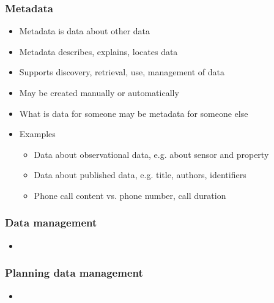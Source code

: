 \documentclass{beamer}
\begin{document}
\begin{frame}
  \frametitle{Metadata}
  
  \begin{itemize}
  \item Metadata is data about other data
  \item Metadata describes, explains, locates data
  \item Supports discovery, retrieval, use, management of data
  \item May be created manually or automatically
  \item What is data for someone may be metadata for someone else
  \item Examples
  \begin{itemize}
    \item Data about observational data, e.g. about sensor and property
    \item Data about published data, e.g. title, authors, identifiers
    \item Phone call content vs. phone number, call duration
  \end{itemize}
  \end{itemize}
\end{frame}

\begin{frame}
  \frametitle{Data management}
  
  \begin{itemize}
  \item 
  \end{itemize}
\end{frame}

\begin{frame}
  \frametitle{Planning data management}
  
  \begin{itemize}
  \item 
  \end{itemize}
\end{frame}
\end{document}
